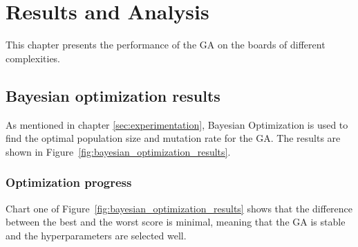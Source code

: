 \section{Results and Analysis}
\label{sec:results-analysis}




This chapter presents the performance of the GA on the boards of different complexities.

\subsection{Bayesian optimization results}

As mentioned in chapter \ref{sec:experimentation}, Bayesian Optimization is used to find the optimal population size and mutation rate for the GA. The results are shown in Figure~\ref{fig:bayesian_optimization_results}.

\subsubsection{Optimization progress}

Chart one of Figure~\ref{fig:bayesian_optimization_results} shows that the difference between the best and the worst score is minimal, meaning that the GA is stable and the hyperparameters are selected well.

